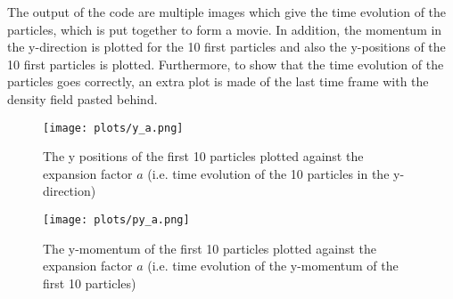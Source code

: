 

The output of the code are multiple images which give the time evolution of the particles, which is put together to form a movie. In addition, the momentum in the y-direction is plotted for the 10 first particles and also the y-positions of the 10 first particles is plotted. Furthermore, to show that the time evolution of the particles goes correctly, an extra plot is made of the last time frame with the density field pasted behind.

\begin{figure}[h]
\centering
\texttt{[image: plots/y\_a.png]}
\caption{The y positions of the first 10 particles plotted against the expansion factor $a$ (i.e. time evolution of the 10 particles in the y-direction)}
\label{y_pos}
\end{figure}

\begin{figure}[h]
\centering
\texttt{[image: plots/py\_a.png]}
\caption{The y-momentum of the first 10 particles plotted against the expansion factor $a$ (i.e. time evolution of the y-momentum of the first 10 particles)}
\label{py}
\end{figure}

